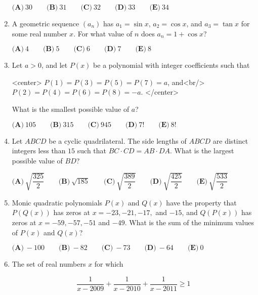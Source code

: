 \documentclass{article}
\begin{document}
\begin{enumerate}[label=\arabic*., itemsep=0.5em]
\(\textbf{(A)}\ 30 \qquad \textbf{(B)}\ 31 \qquad \textbf{(C)}\ 32 \qquad \textbf{(D)}\ 33 \qquad \textbf{(E)}\ 34\)\par \vspace{0.5em}\item A geometric sequence \((a_n)\) has \(a_1=\sin x\), \(a_2=\cos x\), and \(a_3= \tan x\) for some real number \(x\). For what value of \(n\) does \(a_n=1+\cos x\)?


\(\textbf{(A)}\ 4 \qquad \textbf{(B)}\ 5 \qquad \textbf{(C)}\ 6 \qquad \textbf{(D)}\ 7 \qquad \textbf{(E)}\ 8\)\par \vspace{0.5em}\item Let \(a > 0\), and let \(P(x)\) be a polynomial with integer coefficients such that

<center>
\(P(1) = P(3) = P(5) = P(7) = a\), and<br/>
\(P(2) = P(4) = P(6) = P(8) = -a\).
</center>

What is the smallest possible value of \(a\)?

\(\textbf{(A)}\ 105 \qquad \textbf{(B)}\ 315 \qquad \textbf{(C)}\ 945 \qquad \textbf{(D)}\ 7! \qquad \textbf{(E)}\ 8!\)\par \vspace{0.5em}\item Let \(ABCD\) be a cyclic quadrilateral. The side lengths of \(ABCD\) are distinct integers less than \(15\) such that \(BC\cdot CD=AB\cdot DA\). What is the largest possible value of \(BD\)?

\(\textbf{(A)}\ \sqrt{\dfrac{325}{2}} \qquad \textbf{(B)}\ \sqrt{185} \qquad \textbf{(C)}\ \sqrt{\dfrac{389}{2}} \qquad \textbf{(D)}\ \sqrt{\dfrac{425}{2}} \qquad \textbf{(E)}\ \sqrt{\dfrac{533}{2}}\)\par \vspace{0.5em}\item Monic quadratic polynomials \(P(x)\) and \(Q(x)\) have the property that \(P(Q(x))\) has zeros at \(x=-23, -21, -17,\) and \(-15\), and \(Q(P(x))\) has zeros at \(x=-59,-57,-51\) and \(-49\). What is the sum of the minimum values of \(P(x)\) and \(Q(x)\)? 

\(\textbf{(A)}\ -100 \qquad \textbf{(B)}\ -82 \qquad \textbf{(C)}\ -73 \qquad \textbf{(D)}\ -64 \qquad \textbf{(E)}\ 0\)\par \vspace{0.5em}\item The set of real numbers \(x\) for which 


\begin{equation*}
\dfrac{1}{x-2009}+\dfrac{1}{x-2010}+\dfrac{1}{x-2011}\ge1
\end{equation*}



\end{enumerate}
\end{document}
